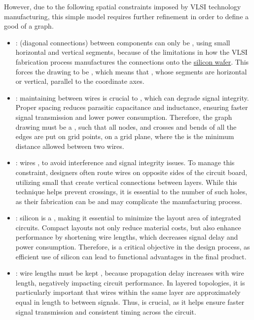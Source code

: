 \documentclass[a4paper, 12pt]{report}
\begin{document}
    However, due to the following spatial constraints imposed by VLSI technology manufacturing, this simple model requires further refinement in order to define a good  of a graph.

    \begin{itemize}
        \item {}:  (diagonal connections) between components can only be , using small horizontal and vertical segments, because of the limitations in how the VLSI fabrication process manufactures the connections onto the \href{https://en.wikipedia.org/wiki/Wafer_(electronics)}{silicon wafer}. This forces the drawing to be , which means that , whose segments are horizontal or vertical, parallel to the coordinate axes.
        \item {}: maintaining  between wires is crucial to , which can degrade signal integrity. Proper spacing reduces parasitic capacitance and inductance, ensuring faster signal transmission and lower power consumption. Therefore, the graph drawing must be a , such that all nodes, and crosses and bends of all the edges are put on grid points, on a grid plane, where the  is the minimum distance allowed between two wires.
        \item {}: wires , to avoid interference and signal integrity issues. To manage this constraint, designers often route wires on opposite sides of the circuit board, utilizing small  that create vertical connections between layers. While this technique helps prevent crossings, it is essential to  the number of such holes, as their fabrication can be  and may complicate the manufacturing process.
        \item {}: silicon is a , making it essential to minimize the layout area of integrated circuits. Compact layouts not only reduce material costs, but also enhance performance by shortening wire lengths, which decreases signal delay and power consumption. Therefore,  is a critical objective in the design process, as efficient use of silicon can lead to functional advantages in the final product.
        \item {}: wire lengths must be kept , because propagation delay increases with wire length, negatively impacting circuit performance. In layered topologies, it is particularly important that wires within the same layer are approximately equal in length to  between signals. Thus,  is crucial, as it helps ensure faster signal transmission and consistent timing across the circuit.
    \end{itemize}
\end{document}
